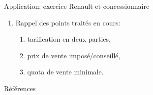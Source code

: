 \begin{frame}[allowframebreaks]{Application: exercice Renault et concessionnaire}
\begin{enumerate}
\begin{enumerate}[$\star$]
    d'éviter que le distributeur/concessionnaire impose sa marge sur le prix, 
    cela par l'incitation ou la contrainte.
    \item Rappel des points traités en cours:
    \begin{enumerate}[$\star$]
        \item tarification en deux parties,
        \item prix de vente imposé/conseillé,
        \item quota de vente minimale.
    \end{enumerate}
\end{enumerate}
\end{enumerate}
\end{frame}

\begin{frame}[allowframebreaks]{Références}


\end{frame}

